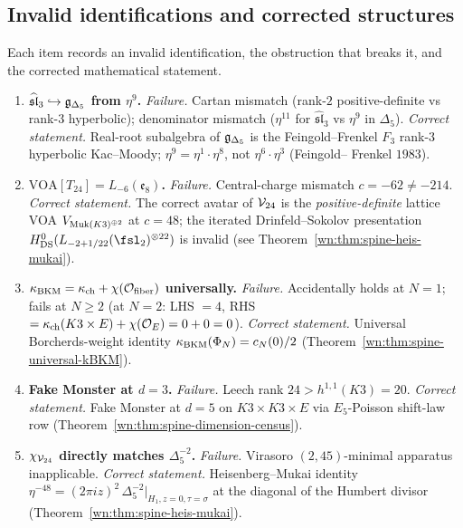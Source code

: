 
\subsection{Invalid identifications and corrected structures}
\label{wn:subsec:spine-invalid-identifications}

\begin{theorem}
\label{wn:thm:spine-invalid-identifications}

Each item records an invalid identification, the obstruction that breaks
it, and the corrected mathematical statement.

\begin{enumerate}
\item \textbf{$\widehat{\mathfrak{sl}}_3 \hookrightarrow \mathfrak{g}_{\Delta_5}$
from $\eta^9$.}
\emph{Failure.} Cartan mismatch (rank-$2$ positive-definite vs rank-$3$
hyperbolic); denominator mismatch ($\eta^{11}$ for
$\widehat{\mathfrak{sl}}_3$ vs $\eta^9$ in $\Delta_5$).
\emph{Correct statement.} Real-root subalgebra of $\mathfrak{g}_{\Delta_5}$ is the
Feingold--Frenkel $F_3$ rank-$3$ hyperbolic Kac--Moody;
$\eta^9 = \eta^1 \cdot \eta^8$, not $\eta^6 \cdot \eta^3$ (Feingold--
Frenkel $1983$).

\item \textbf{$\mathrm{VOA}[T_{24}] = L_{-6}(\mathfrak{e}_8)$.}
\emph{Failure.} Central-charge mismatch $c = -62 \neq -214$.
\emph{Correct statement.} The correct avatar of $\mathcal{V}_{24}$ is the
\emph{positive-definite} lattice VOA $V_{\mathrm{Muk}(K3)^{\oplus 2}}$ at
$c = 48$; the iterated Drinfeld--Sokolov presentation
$H^0_{\mathrm{DS}}(L_{-2 + 1/22}(\fsl_2)^{\otimes 22})$ is invalid
(see Theorem~\ref{wn:thm:spine-heis-mukai}).

\item \textbf{$\kappa_{\mathrm{BKM}} = \kappa_{\mathrm{ch}} + \chi(\mathcal{O}_{\mathrm{fiber}})$ universally.}
\emph{Failure.} Accidentally holds at $N = 1$; fails at $N \geq 2$
(at $N = 2$: LHS $= 4$, RHS $= \kappa_{\mathrm{ch}}(K3\times E) + \chi(\mathcal{O}_E) =
0 + 0 = 0$).
\emph{Correct statement.} Universal Borcherds-weight identity
$\kappa_{\mathrm{BKM}}(\Phi_N) = c_N(0)/2$ (Theorem~\ref{wn:thm:spine-universal-kBKM}).

\item \textbf{Fake Monster at $d = 3$.}
\emph{Failure.} Leech rank $24 > h^{1,1}(K3) = 20$.
\emph{Correct statement.} Fake Monster at $d = 5$ on $K3 \times K3 \times E$ via
$E_5$-Poisson shift-law row (Theorem~\ref{wn:thm:spine-dimension-census}).

\item \textbf{$\chi_{\mathcal{V}_{24}}$ directly matches $\Delta_5^{-2}$.}
\emph{Failure.} Virasoro $(2, 45)$-minimal apparatus inapplicable.
\emph{Correct statement.} Heisenberg--Mukai identity
$\eta^{-48} = (2\pi i z)^2\,\Delta_5^{-2}|_{H_1, z = 0, \tau = \sigma}$
at the diagonal of the Humbert divisor
(Theorem~\ref{wn:thm:spine-heis-mukai}).


\end{enumerate}
\end{theorem}
